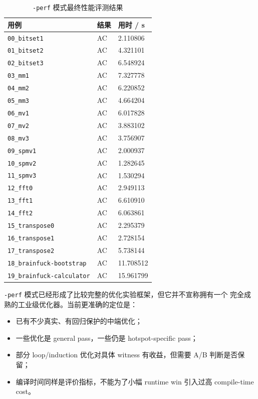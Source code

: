\documentclass[UTF8,a4paper,11pt]{ctexart}
\begin{document}
\begin{table}[ht]
\centering
\footnotesize
\begin{tabular}{@{}lll@{}}
\toprule
用例 & 结果 & 用时 / s \\
\midrule
\texttt{00\_bitset1} & AC & 2.110806 \\
\texttt{01\_bitset2} & AC & 4.321101 \\
\texttt{02\_bitset3} & AC & 6.548924 \\
\texttt{03\_mm1} & AC & 7.327778 \\
\texttt{04\_mm2} & AC & 6.220852 \\
\texttt{05\_mm3} & AC & 4.664204 \\
\texttt{06\_mv1} & AC & 6.017828 \\
\texttt{07\_mv2} & AC & 3.883102 \\
\texttt{08\_mv3} & AC & 3.756907 \\
\texttt{09\_spmv1} & AC & 2.000937 \\
\texttt{10\_spmv2} & AC & 1.282645 \\
\texttt{11\_spmv3} & AC & 1.530294 \\
\texttt{12\_fft0} & AC & 2.949113 \\
\texttt{13\_fft1} & AC & 6.610910 \\
\texttt{14\_fft2} & AC & 6.063861 \\
\texttt{15\_transpose0} & AC & 2.295379 \\
\texttt{16\_transpose1} & AC & 2.728154 \\
\texttt{17\_transpose2} & AC & 5.738144 \\
\texttt{18\_brainfuck-bootstrap} & AC & 11.708512 \\
\texttt{19\_brainfuck-calculator} & AC & 15.961799 \\
\bottomrule
\end{tabular}
\caption{\texttt{-perf} 模式最终性能评测结果}
\end{table}

\texttt{-perf} 模式已经形成了比较完整的优化实验框架，但它并不宣称拥有一个
完全成熟的工业级优化器。当前更准确的定位是：

\begin{itemize}
  \item 已有不少真实、有回归保护的中端优化；
  \item 一些优化是 general pass，一些仍是 hotspot-specific pass；
  \item 部分 loop/induction 优化对具体 witness 有收益，但需要 A/B 判断是否保留；
  \item 编译时间同样是评价指标，不能为了小幅 runtime win 引入过高 compile-time cost。
\end{itemize}
\end{document}
